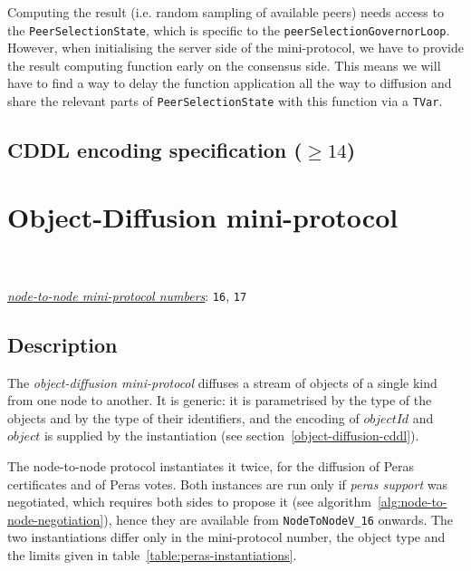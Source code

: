 Computing the result (i.e. random sampling of available peers) needs access to the
\texttt{PeerSelectionState}, which is specific to the \texttt{peerSelectionGovernorLoop}. However, when
initialising the server side of the mini-protocol, we have to provide the result computing
function early on the consensus side. This means we will have to find a way to delay the
function application all the way to diffusion and share the relevant parts of
\texttt{PeerSelectionState} with this function via a \texttt{TVar}.

\subsection{CDDL encoding specification ($\geq 14$)}\label{peersharing-cddl}


\section{Object-Diffusion mini-protocol}
\\
\\
\hyperref[table:node-to-node-protocol-numbers]{\textit{node-to-node mini-protocol numbers}}: \texttt{16}, \texttt{17}\\
\label{object-diffusion-protocol}
\label{peras-protocol}

\subsection{Description}

The \textit{object-diffusion mini-protocol} diffuses a stream of objects of
a single kind from one node to another.  It is generic: it is parametrised by
the type of the objects and by the type of their identifiers, and the encoding
of $objectId$ and $object$ is supplied by the instantiation (see
section~\ref{object-diffusion-cddl}).

The node-to-node protocol instantiates it twice, for the diffusion of Peras
certificates and of Peras votes.  Both instances are run only if \textit{peras
support} was negotiated, which requires both sides to propose it (see
algorithm~\ref{alg:node-to-node-negotiation}), hence they are available from
\texttt{NodeToNodeV\_16} onwards.  The two instantiations differ only in the
mini-protocol number, the object type and the limits given in
table~\ref{table:peras-instantiations}.

